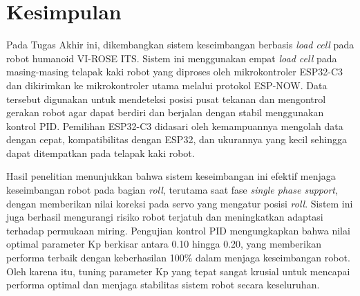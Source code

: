\section{Kesimpulan}
\label{sec:kesimpulan}

Pada Tugas Akhir ini, dikembangkan sistem keseimbangan berbasis \emph{load cell} pada robot humanoid VI-ROSE ITS. Sistem ini menggunakan empat \emph{load cell} pada masing-masing telapak kaki robot yang diproses oleh mikrokontroler ESP32-C3 dan dikirimkan ke mikrokontroler utama melalui protokol ESP-NOW. Data tersebut digunakan untuk mendeteksi posisi pusat tekanan dan mengontrol gerakan robot agar dapat berdiri dan berjalan dengan stabil menggunakan kontrol PID. Pemilihan ESP32-C3 didasari oleh kemampuannya mengolah data dengan cepat, kompatibilitas dengan ESP32, dan ukurannya yang kecil sehingga dapat ditempatkan pada telapak kaki robot.

Hasil penelitian menunjukkan bahwa sistem keseimbangan ini efektif menjaga keseimbangan robot pada bagian \textit{roll}, terutama saat fase \textit{single phase support}, dengan memberikan nilai koreksi pada servo yang mengatur posisi \textit{roll}. Sistem ini juga berhasil mengurangi risiko robot terjatuh dan meningkatkan adaptasi terhadap permukaan miring. Pengujian kontrol PID mengungkapkan bahwa nilai optimal parameter Kp berkisar antara 0.10 hingga 0.20, yang memberikan performa terbaik dengan keberhasilan 100\% dalam menjaga keseimbangan robot. Oleh karena itu, tuning parameter Kp yang tepat sangat krusial untuk mencapai performa optimal dan menjaga stabilitas sistem robot secara keseluruhan.
